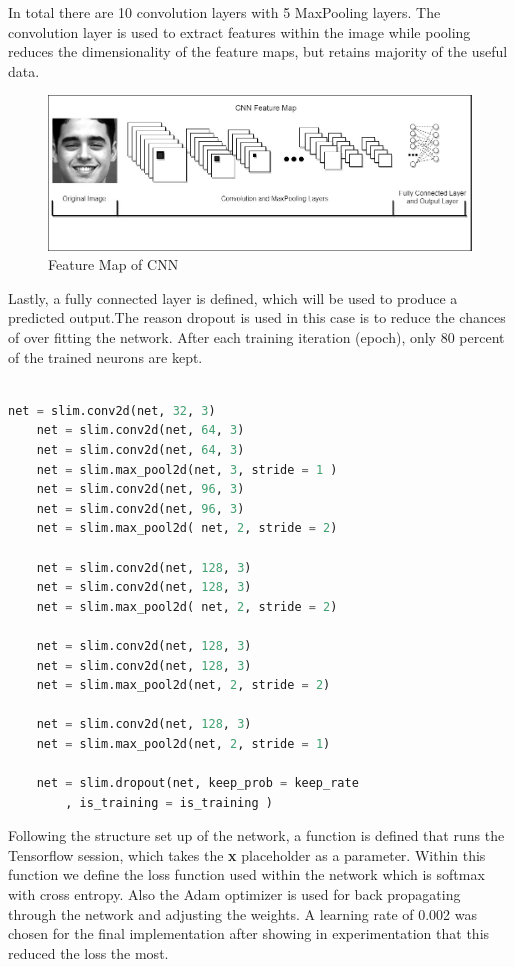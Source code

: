 In total there are 10 convolution layers with 5 MaxPooling layers. The convolution layer is used to extract features within the image while pooling reduces the dimensionality of the feature maps, but retains majority of the useful data.
\begin{figure}[ht]
	\begin{center}
		\advance\leftskip-3cm
		\advance\rightskip-3cm
		\includegraphics[keepaspectratio=true,scale=0.5]{__resources/implementation/map.jpg}
		\caption{Feature Map of CNN}
		\label{map}
	\end{center}
\end{figure}
Lastly, a fully connected layer is defined, which will be used to produce a predicted output.The reason dropout is used in this case is to reduce the chances of over fitting the network. After each training iteration (epoch), only 80 percent of the trained neurons are kept.\\ \\



\begin{lstlisting}[language=python, frame=single]
	net = slim.conv2d(net, 32, 3)
	net = slim.conv2d(net, 64, 3)
	net = slim.conv2d(net, 64, 3)
	net = slim.max_pool2d(net, 3, stride = 1 )
	net = slim.conv2d(net, 96, 3)
	net = slim.conv2d(net, 96, 3)
	net = slim.max_pool2d( net, 2, stride = 2)
	
	net = slim.conv2d(net, 128, 3)
	net = slim.conv2d(net, 128, 3)
	net = slim.max_pool2d( net, 2, stride = 2)
	
	net = slim.conv2d(net, 128, 3)
	net = slim.conv2d(net, 128, 3)
	net = slim.max_pool2d(net, 2, stride = 2)
	
	net = slim.conv2d(net, 128, 3)
	net = slim.max_pool2d(net, 2, stride = 1)
	
	net = slim.dropout(net, keep_prob = keep_rate
		, is_training = is_training )
\end{lstlisting}

Following the structure set up of the network, a function is defined that runs the Tensorflow session, which takes the \textbf{x} placeholder as a parameter.
Within this function we define the loss function used within the network which is softmax with cross entropy. Also the Adam optimizer is used for back propagating through the network and adjusting the weights. A learning rate of 0.002 was chosen for the final implementation after showing in experimentation that this reduced the loss the most. 

